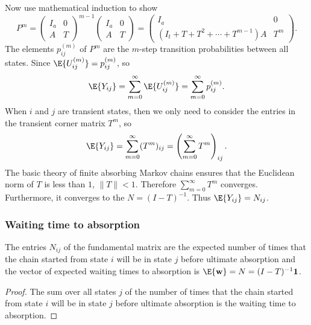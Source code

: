 \documentclass[12pt]{article}
\begin{document}
Now use mathematical induction to show
\[
    P^{m} =
    \begin{pmatrix}
        I_a & 0 \\
        A & T
    \end{pmatrix}
    ^{m-1}
    \begin{pmatrix}
        I_a & 0 \\
        A & T
    \end{pmatrix}
    =
    \begin{pmatrix}
        I_a & 0 \\
        (I_t + T + T^2 + \cdots + T^{m-1})A & T^m
    \end{pmatrix}.
\]  The
elements \( p_{ij}^{(m)} \) of \( P^m \) are the \( m \)-step transition
probabilities between all states.  Since \( \E{U_{ij}^{(m)}} = p_{ij}^{%
(m)} \), so
\[
    \E{Y_{ij}} = \sum\limits_{m=0}^{\infty} \E{U_{ij}^{(m)}} = \sum\limits_
    {m=0}^{\infty} p_{ij}^{(m)}.
\] When \( i \) and \( j \) are transient states, then we only need to
consider the entries in the transient corner matrix \( T^m \), so
\[
    \E{Y_{ij}} = \sum\limits_{m=0}^{\infty} (T^m)_{ij} = \left( \sum\limits_
    {m=0}^{\infty} T^m \right)_{ij}.
\] The basic theory of finite absorbing Markov chains ensures that the
Euclidean norm of \( T \) is less than \( 1 \), \( \| T \| < 1 \).
Therefore \( \sum\limits_{m=0}^{\infty} T^m \) converges.  Furthermore,
it converges to the  \( N = (I-T)^{-1} \).%
Thus \( \E{Y_{ij}} = N_{ij} \).

\subsubsection*{Waiting time to absorption}

\begin{theorem}
    The entries \( N_{ij} \) of the fundamental matrix are the
    expected number of times that the chain started from state \( i \) will
    be in state \( j \) before ultimate absorption and the vector of expected
    waiting times to absorption is
    \( \E{\mathbf{w}} = N = (I-T)^{-1} \mathbf{1} \).
\end{theorem}

\begin{proof}
  The sum over all states $j$ of the number of times that the chain
  started from state \( i \) will be in state \( j \) before ultimate
  absorption is the waiting time to absorption.
\end{proof}
\end{document}
